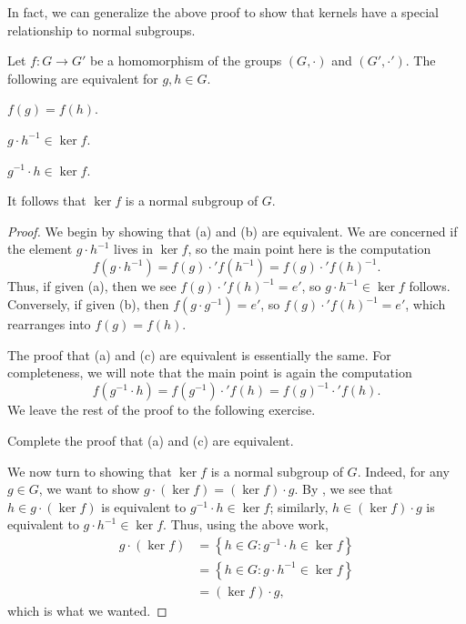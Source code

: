 \documentclass[../notes.tex]{subfiles}
\begin{document}
In fact, we can generalize the above proof to show that kernels have a special relationship to normal subgroups.
\begin{proposition} \label{prop:ker-normal}
    Let $f\colon G\to G'$ be a homomorphism of the groups $(G,\cdot)$ and $(G',\cdot')$. The following are equivalent for $g,h\in G$.
    \begin{listalph}
        \item $f(g)=f(h)$.
        \item $g\cdot h^{-1}\in\ker f$.
        \item $g^{-1}\cdot h\in\ker f$.
    \end{listalph}
    It follows that $\ker f$ is a normal subgroup of $G$.
\end{proposition}
\begin{proof}
    We begin by showing that (a) and (b) are equivalent. We are concerned if the element $g\cdot h^{-1}$ lives in $\ker f$, so the main point here is the computation
    \[f\left(g\cdot h^{-1}\right)=f(g)\cdot'f\left(h^{-1}\right)=f(g)\cdot'f(h)^{-1}.\]
    Thus, if given (a), then we see $f(g)\cdot'f(h)^{-1}=e'$, so $g\cdot h^{-1}\in\ker f$ follows. Conversely, if given (b), then $f\left(g\cdot g^{-1}\right)=e'$, so $f(g)\cdot'f(h)^{-1}=e'$, which rearranges into $f(g)=f(h)$.
    
    The proof that (a) and (c) are equivalent is essentially the same. For completeness, we will note that the main point is again the computation
    \[f\left(g^{-1}\cdot h\right)=f\left(g^{-1}\right)\cdot'f(h)=f(g)^{-1}\cdot'f(h).\]
    We leave the rest of the proof to the following exercise.
    \begin{exe}
        Complete the proof that (a) and (c) are equivalent.
    \end{exe}
    We now turn to showing that $\ker f$ is a normal subgroup of $G$. Indeed, for any $g\in G$, we want to show $g\cdot(\ker f)=(\ker f)\cdot g$. By , we see that $h\in g\cdot(\ker f)$ is equivalent to $g^{-1}\cdot h\in\ker f$; similarly, $h\in(\ker f)\cdot g$ is equivalent to $g\cdot h^{-1}\in\ker f$. Thus, using the above work,
    \begin{align*}
        g\cdot(\ker f) &= \left\{h\in G:g^{-1}\cdot h\in\ker f\right\} \\
        &= \left\{h\in G:g\cdot h^{-1}\in\ker f\right\} \\
        &= (\ker f)\cdot g,
    \end{align*}
    which is what we wanted.
\end{proof}
\end{document}
